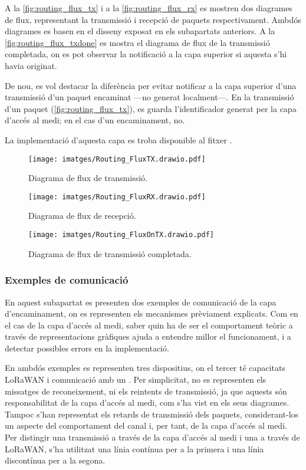 \documentclass{tfgitic}[2024/07/01]
\begin{document}
{A la \autoref{fig:routing_flux_tx} i a la \autoref{fig:routing_flux_rx} es mostren dos diagrames de flux, representant la transmissió i recepció de paquets respectivament. Ambdós diagrames es basen en el disseny exposat en els subapartats anteriors. A la \autoref{fig:routing_flux_txdone} es mostra el diagrama de flux de la transmissió completada, on es pot observar la notificació a la capa superior si aquesta s'hi havia originat. 

De nou, es vol destacar la diferència per evitar notificar a la capa superior d'una transmissió d'un paquet encaminat ---no generat localment---. En la transmissió d'un paquet (\autoref{fig:routing_flux_tx}), es guarda l'identificador generat per la capa d'accés al medi; en el cas d'un encaminament, no.

La implementació d'aquesta capa es troba disponible al fitxer .

\begin{figure}
    \centering
        \texttt{[image: imatges/Routing\_FluxTX.drawio.pdf]}
    \caption{Diagrama de flux de transmissió.}
    \label{fig:routing_flux_tx}
\end{figure}

\begin{figure}
    \centering
        \texttt{[image: imatges/Routing\_FluxRX.drawio.pdf]}
    \caption{Diagrama de flux de recepció.}
    \label{fig:routing_flux_rx}
\end{figure}

\begin{figure}
    \centering
        \texttt{[image: imatges/Routing\_FluxOnTX.drawio.pdf]}
    \caption{Diagrama de flux de transmissió completada.}
    \label{fig:routing_flux_txdone}
\end{figure}

\subsubsection{Exemples de comunicació}
En aquest subapartat es presenten dos exemples de comunicació de la capa d'encaminament, on es representen els mecanismes prèviament explicats. Com en el cas de la capa d'accés al medi, saber quin ha de ser el comportament teòric a través de representacions gràfiques ajuda a entendre millor el funcionament, i a detectar possibles errors en la implementació. 

En ambdós exemples es representen tres dispositius, on el tercer té capacitats LoRaWAN i comunicació amb un . Per simplicitat, no es representen els missatges de reconeixement, ni els reintents de transmissió, ja que aquests són responsabilitat de la capa d'accés al medi, com s'ha vist en els seus diagrames. Tampoc s'han representat els retards de transmissió dels paquets, considerant-los un aspecte del comportament del canal i, per tant, de la capa d'accés al medi. Per distingir una transmissió a través de la capa d'accés al medi i una a través de LoRaWAN, s'ha utilitzat una línia contínua per a la primera i una línia discontínua per a la segona.

}
\end{document}
